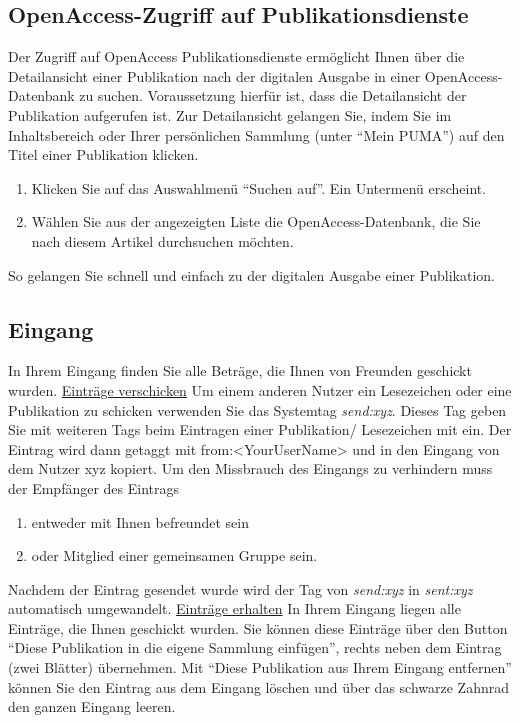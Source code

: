 \documentclass[b5paper,11pt,twoside]{scrbook} %
\begin{document}
\subsection{OpenAccess-Zugriff auf Publikationsdienste}%
Der Zugriff auf OpenAccess Publikationsdienste ermöglicht Ihnen über die Detailansicht einer Publikation nach der digitalen Ausgabe in einer OpenAccess-Datenbank zu suchen. Voraussetzung hierfür ist, dass die Detailansicht der Publikation aufgerufen ist. Zur Detailansicht gelangen Sie, indem Sie im Inhaltsbereich oder Ihrer persönlichen Sammlung (unter \enquote{Mein PUMA}) auf den Titel einer Publikation klicken. 
\begin{enumerate}
    \item Klicken Sie auf das Auswahlmenü \enquote{Suchen auf}. Ein Untermenü erscheint.
    \item Wählen Sie aus der angezeigten Liste die OpenAccess-Datenbank, die Sie nach diesem Artikel durchsuchen möchten. 
\end{enumerate}
 So gelangen Sie schnell und einfach zu der digitalen Ausgabe einer Publikation. 
\subsection{Eingang}
In Ihrem Eingang finden Sie alle Beträge, die Ihnen von Freunden geschickt wurden.
\newline
\newline
\underline{Einträge verschicken}
\newline
Um einem anderen Nutzer ein Lesezeichen oder eine Publikation zu schicken verwenden Sie das Systemtag \textit{send:xyz}. Dieses Tag geben Sie mit weiteren Tags beim Eintragen einer Publikation/ Lesezeichen mit ein. Der Eintrag wird dann getaggt mit from:<YourUserName> und in den Eingang von dem Nutzer xyz kopiert. Um den Missbrauch des Eingangs zu verhindern muss der Empfänger des Eintrags
\begin{enumerate}
    \item entweder mit Ihnen befreundet sein
    \item oder Mitglied einer gemeinsamen Gruppe sein.
\end{enumerate}
Nachdem der Eintrag gesendet wurde wird der Tag von \textit{send:xyz} in \textit{sent:xyz} automatisch umgewandelt.
\newline
\newline
\underline{Einträge erhalten}
\newline
In Ihrem Eingang liegen alle Einträge, die Ihnen geschickt wurden. Sie können diese Einträge über den Button \enquote{Diese Publikation in die eigene Sammlung einfügen}, rechts neben dem Eintrag (zwei Blätter) übernehmen. Mit \enquote{Diese Publikation aus Ihrem Eingang entfernen} können Sie den Eintrag aus dem Eingang löschen und über das schwarze Zahnrad den ganzen Eingang leeren.
\newpage
\end{document}
